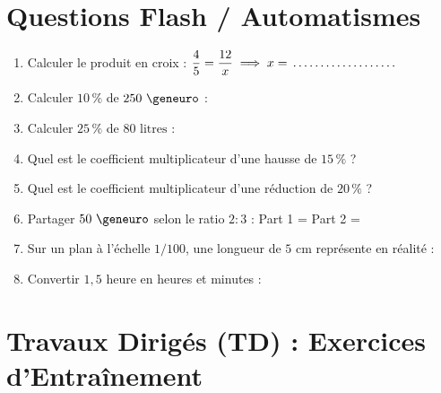 \section{Questions Flash / Automatismes}

\begin{automatisme}
\begin{enumerate}[label=\textbf{Q\arabic*.}]
    \item Calculer le produit en croix : $\dfrac{4}{5} = \dfrac{12}{x} \implies x = \pointille[3cm]$
    \item Calculer $10\,\%$ de $250\text{ \euro{}}$ : \pointille[4cm]
    \item Calculer $25\,\%$ de $80\text{ litres}$ : \pointille[4cm]
    \item Quel est le coefficient multiplicateur d'une hausse de $15\,\%$ ? \pointille[3cm]
    \item Quel est le coefficient multiplicateur d'une réduction de $20\,\%$ ? \pointille[3cm]
    \item Partager $50\text{ \euro{}}$ selon le ratio $2 : 3$ : Part 1 = \pointille[2cm] \quad Part 2 = \pointille[2cm]
    \item Sur un plan à l'échelle $1/100$, une longueur de $5\text{ cm}$ représente en réalité : \pointille[3cm]
    \item Convertir $1{,}5\text{ heure}$ en heures et minutes : \pointille[3cm]
\end{enumerate}
\end{automatisme}

\section{Travaux Dirigés (TD) : Exercices d'Entraînement}

